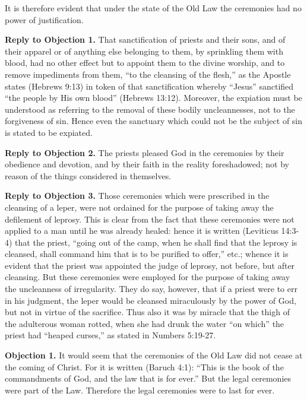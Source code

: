It is therefore evident that under the state of the Old Law the ceremonies had no power of justification.

\textbf{Reply to Objection 1.} That sanctification of priests and their sons, and of their apparel or of anything else belonging to them, by sprinkling them with blood, had no other effect but to appoint them to the divine worship, and to remove impediments from them, ``to the cleansing of the flesh,'' as the Apostle states (Hebrews 9:13) in token of that sanctification whereby ``Jesus'' sanctified ``the people by His own blood'' (Hebrews 13:12). Moreover, the expiation must be understood as referring to the removal of these bodily uncleannesses, not to the forgiveness of sin. Hence even the sanctuary which could not be the subject of sin is stated to be expiated.

\textbf{Reply to Objection 2.} The priests pleased God in the ceremonies by their obedience and devotion, and by their faith in the reality foreshadowed; not by reason of the things considered in themselves.

\textbf{Reply to Objection 3.} Those ceremonies which were prescribed in the cleansing of a leper, were not ordained for the purpose of taking away the defilement of leprosy. This is clear from the fact that these ceremonies were not applied to a man until he was already healed: hence it is written (Leviticus 14:3-4) that the priest, ``going out of the camp, when he shall find that the leprosy is cleansed, shall command him that is to be purified to offer,'' etc.; whence it is evident that the priest was appointed the judge of leprosy, not before, but after cleansing. But these ceremonies were employed for the purpose of taking away the uncleanness of irregularity. They do say, however, that if a priest were to err in his judgment, the leper would be cleansed miraculously by the power of God, but not in virtue of the sacrifice. Thus also it was by miracle that the thigh of the adulterous woman rotted, when she had drunk the water ``on which'' the priest had ``heaped curses,'' as stated in Numbers 5:19-27.


\textbf{Objection 1.} It would seem that the ceremonies of the Old Law did not cease at the coming of Christ. For it is written (Baruch 4:1): ``This is the book of the commandments of God, and the law that is for ever.'' But the legal ceremonies were part of the Law. Therefore the legal ceremonies were to last for ever.

